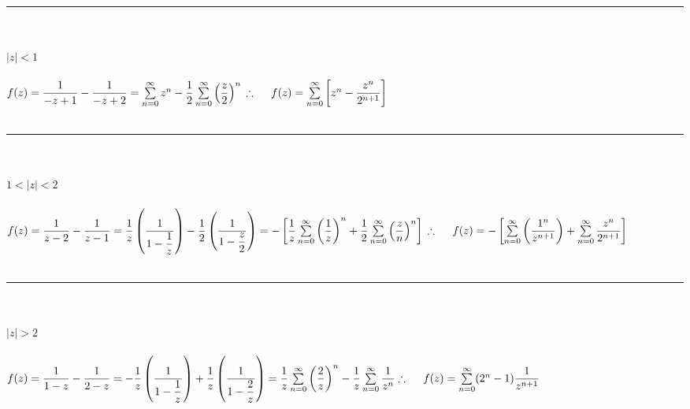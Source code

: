\documentclass[fleqn]{article}
\begin{document}
\begin{enumerate}
      \textcolor{hwColor}{
        \rule{15cm}{1pt}
        \\
        \\
        \textbf{$|z|<1$}
        \\
        \\
        $
          f(z)=\dfrac{1}{-z+1}-\dfrac{1}{-z+2}=\sum\limits_{n=0}^{\infty} z^n-\dfrac{1}{2} \sum\limits_{n=0}^{\infty} \left(\dfrac{z}{2}\right)^n
          \\
          \\
          \\
          \therefore ~~~~ f(z)=\sum\limits_{n=0}^{\infty} \left[z^n-\dfrac{z^n}{2^{n+1}}\right]
        $
        \\
        \\
        \rule{15cm}{1pt}
        \\
        \\
        \textbf{$1<|z|<2$}
        \\
        \\
        $
          f(z)=\dfrac{1}{z-2}-\dfrac{1}{z-1}
          =\dfrac{1}{z} \left(\dfrac{1}{1-\dfrac{1}{z}}\right)-\dfrac{1}{2} \left(\dfrac{1}{1-\dfrac{z}{2}}\right)
          =-\left[\dfrac{1}{z} \sum\limits_{n=0}^{\infty} \left(\dfrac{1}{z}\right)^n+\dfrac{1}{2} \sum\limits_{n=0}^{\infty} \left(\dfrac{z}{n}\right)^n \right]
          \\
          \\
          \\
          \therefore ~~~~ f(z)=-\left[\sum\limits_{n=0}^{\infty} \left(\dfrac{1^n}{z^{n+1}}\right)+\sum\limits_{n=0}^{\infty} \dfrac{z^n}{2^{n+1}}\right]   
        $
        \\
        \\
        \rule{15cm}{1pt}
        \\
        \\
        \textbf{$|z|>2$}
        \\
        \\
        $
          f(z)=\dfrac{1}{1-z}-\dfrac{1}{2-z}=-\dfrac{1}{z} \left(\dfrac{1}{1-\dfrac{1}{z}}\right)+\dfrac{1}{z} \left(\dfrac{1}{1-\dfrac{2}{z}}\right)
          =\dfrac{1}{z} \sum\limits_{n=0}^{\infty} \left(\dfrac{2}{z}\right)^n-\dfrac{1}{z} \sum\limits_{n=0}^{\infty} \dfrac{1}{z^n}
          \\
          \\
          \\
          \therefore ~~~~ f(z)=\sum\limits_{n=0}^{\infty} (2^n-1) \dfrac{1}{z^{n+1}}
        $
      }


\end{enumerate}
\end{document}
